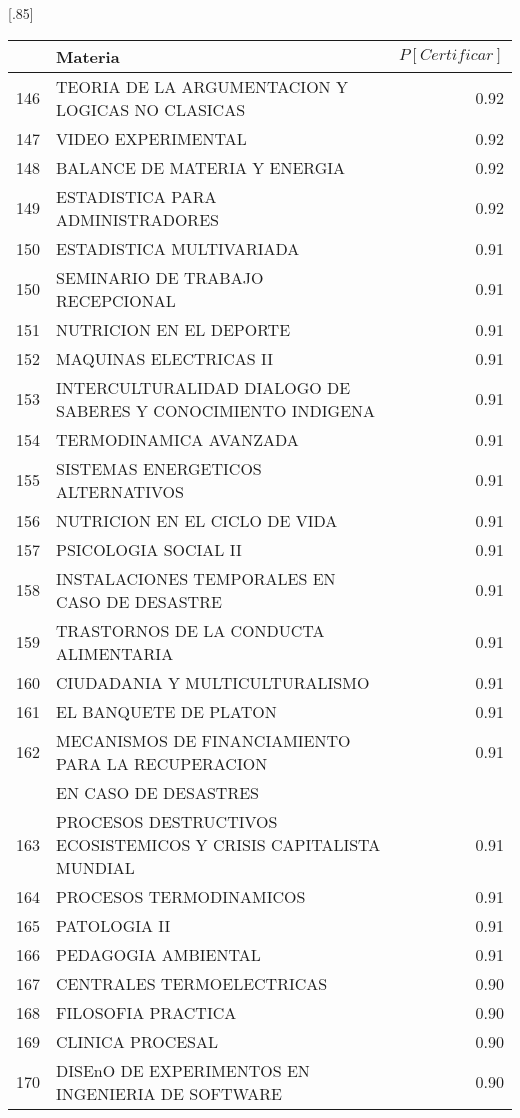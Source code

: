 \documentclass[12pt]{article}
\begin{document}
\begin{table}[ht]
\centering
\scalebox{0.75}[.85]{
\begin{tabular}{rlr}
  \hline
 & Materia & $P[Certificar]$  \\ 
  \hline
  146 & TEORIA DE LA ARGUMENTACION Y LOGICAS NO CLASICAS & 0.92 \\ 
  147 & VIDEO EXPERIMENTAL & 0.92 \\ 
  148 & BALANCE DE MATERIA Y ENERGIA & 0.92 \\ 
  149 & ESTADISTICA PARA ADMINISTRADORES & 0.92 \\ 
  150 & ESTADISTICA MULTIVARIADA & 0.91 \\ 
  150 & SEMINARIO DE TRABAJO RECEPCIONAL & 0.91 \\ 
  151 & NUTRICION EN EL DEPORTE & 0.91 \\ 
  152 & MAQUINAS ELECTRICAS II & 0.91 \\ 
  153 & INTERCULTURALIDAD DIALOGO DE SABERES Y CONOCIMIENTO INDIGENA & 0.91 \\ 
  154 & TERMODINAMICA AVANZADA & 0.91 \\ 
  155 & SISTEMAS ENERGETICOS ALTERNATIVOS & 0.91 \\ 
  156 & NUTRICION EN EL CICLO DE VIDA & 0.91 \\ 
  157 & PSICOLOGIA SOCIAL II & 0.91 \\ 
  158 & INSTALACIONES TEMPORALES EN CASO DE DESASTRE & 0.91 \\ 
  159 & TRASTORNOS DE LA CONDUCTA ALIMENTARIA & 0.91 \\ 
  160 & CIUDADANIA Y MULTICULTURALISMO & 0.91 \\ 
  161 & EL BANQUETE DE PLATON & 0.91 \\ 
  162 & MECANISMOS DE FINANCIAMIENTO PARA LA RECUPERACION  & 0.91 \\ 
  & EN CASO DE DESASTRES & \\ 
 163 & PROCESOS DESTRUCTIVOS ECOSISTEMICOS Y CRISIS CAPITALISTA MUNDIAL & 0.91 \\ 
  164 & PROCESOS TERMODINAMICOS & 0.91 \\ 
  165 & PATOLOGIA II & 0.91 \\ 
  166 & PEDAGOGIA AMBIENTAL & 0.91 \\ 
  167 & CENTRALES TERMOELECTRICAS & 0.90 \\ 
  168 & FILOSOFIA PRACTICA & 0.90 \\ 
  169 & CLINICA PROCESAL & 0.90 \\ 
  170 & DISEnO DE EXPERIMENTOS EN INGENIERIA DE SOFTWARE & 0.90 \\ 

\end{tabular}}
\end{table}
\end{document}
